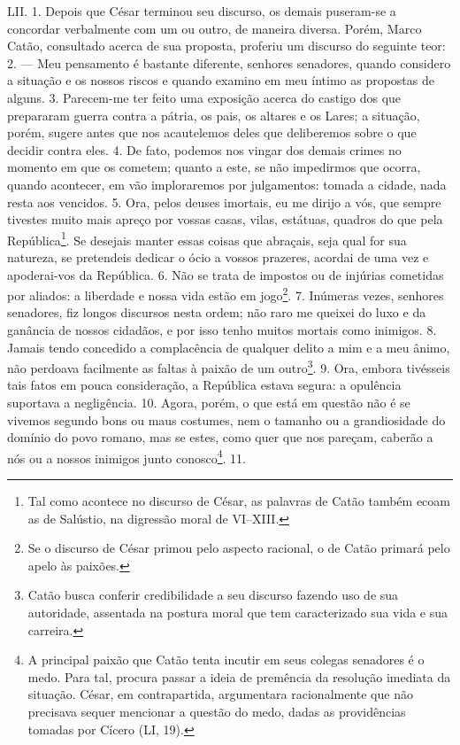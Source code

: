 LII. 1. Depois que César terminou seu discurso, os demais puseram-se a concordar 
verbalmente com um ou outro, de maneira diversa. Porém, Marco Catão, consultado
acerca de sua proposta, proferiu um discurso do seguinte teor: 2. --- Meu
pensamento é bastante diferente, senhores senadores, quando considero a
situação e os nossos riscos e quando examino em meu íntimo as propostas de
alguns. 3. Parecem-me ter feito uma exposição acerca do castigo dos que
prepararam guerra contra a pátria, os pais, os altares e os Lares; a situação,
porém, sugere antes que nos acautelemos deles que deliberemos sobre o que
decidir contra eles. 4. De fato, podemos nos vingar dos demais crimes no
momento em que os cometem; quanto a este, se não impedirmos que ocorra, quando
acontecer, em vão imploraremos por julgamentos: tomada a cidade, nada resta aos
vencidos. 5. Ora, pelos deuses imortais, eu me dirijo a vós, que sempre
tivestes muito mais apreço por vossas casas, vilas, estátuas, quadros do que
pela República\footnote{Tal como acontece no discurso de César, as palavras de
Catão também ecoam as de Salústio, na digressão moral de VI--XIII.}. Se
desejais manter essas coisas que abraçais, seja qual for sua natureza, se
pretendeis dedicar o ócio a vossos prazeres, acordai de uma vez e apoderai-vos
da República. 6. Não se trata de impostos ou de injúrias cometidas por aliados:
a liberdade e nossa vida estão em jogo\footnote{Se o discurso de César primou
pelo aspecto racional, o de Catão primará pelo apelo às paixões.}. 7. Inúmeras
vezes, senhores senadores, fiz longos discursos nesta ordem; não raro me
queixei do luxo e da ganância de nossos cidadãos, e por isso tenho muitos
mortais como inimigos. 8. Jamais tendo concedido a complacência de qualquer
delito a mim e a meu ânimo, não perdoava facilmente as faltas à paixão de um
outro\footnote{Catão busca conferir credibilidade a seu discurso fazendo uso de
sua autoridade, assentada na postura moral que tem caracterizado sua vida e sua
carreira.}. 9. Ora, embora tivésseis tais fatos em pouca consideração, a
República estava segura: a opulência suportava a negligência. 10. Agora, porém,
o que está em questão não é se vivemos segundo bons ou maus costumes, nem o tamanho
ou a grandiosidade do domínio do povo romano, mas se estes, como quer que nos
pareçam, caberão a nós ou a nossos inimigos junto conosco\footnote{A principal
paixão que Catão tenta incutir em seus colegas senadores é o medo. Para tal,
procura passar a ideia de premência da resolução imediata da situação. César,
em contrapartida, argumentara racionalmente que não precisava sequer mencionar
a questão do medo, dadas as providências tomadas por Cícero (LI, 19).}. 11.
